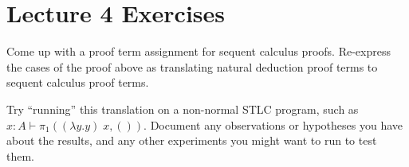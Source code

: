 \documentclass{article}
\begin{document}
\section{Lecture 4 Exercises}


\begin{exercise}
  Come up with a proof term assignment for sequent calculus proofs.
  Re-express the cases of the proof above as translating
  natural deduction proof terms to sequent calculus proof terms.

  Try ``running'' this translation on a non-normal STLC program,
  such as $x:A \vdash \pi_1 ((\lambda{y}.y)\;x, ())$.
  Document any observations or hypotheses you have about the
  results, and any other experiments you might want to run
  to test them.
\end{exercise}
\end{document}
